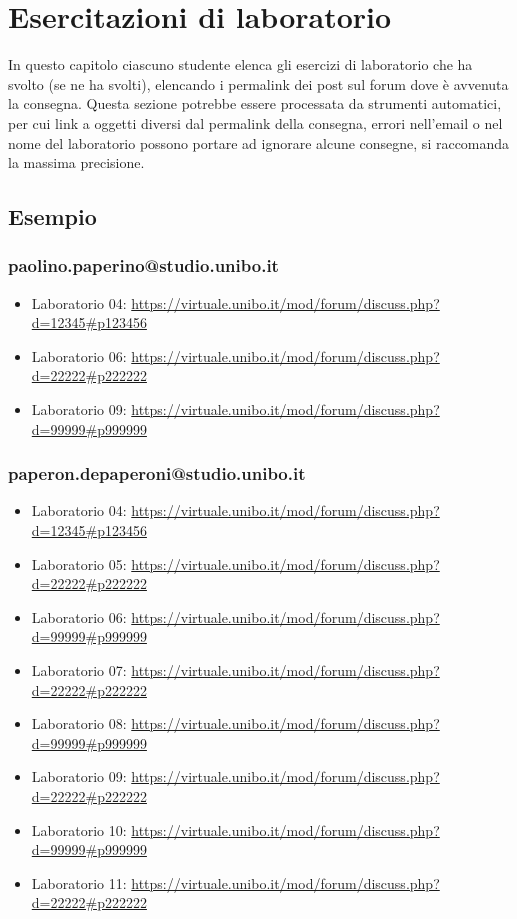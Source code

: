 \documentclass[a4paper,12pt]{report}
\begin{document}
\chapter{Esercitazioni di laboratorio}

In questo capitolo ciascuno studente elenca gli esercizi di laboratorio che ha svolto
(se ne ha svolti),
elencando i permalink dei post sul forum dove è avvenuta la consegna.
%
Questa sezione potrebbe essere processata da strumenti automatici,
per cui link a oggetti diversi dal permalink della consegna,
errori nell'email o nel nome del laboratorio possono portare ad ignorare alcune consegne,
si raccomanda la massima precisione.

\section*{Esempio}

\subsection{paolino.paperino@studio.unibo.it}

\begin{itemize}
 \item Laboratorio 04: \url{https://virtuale.unibo.it/mod/forum/discuss.php?d=12345#p123456}
 \item Laboratorio 06: \url{https://virtuale.unibo.it/mod/forum/discuss.php?d=22222#p222222}
 \item Laboratorio 09: \url{https://virtuale.unibo.it/mod/forum/discuss.php?d=99999#p999999}
\end{itemize}

\subsection{paperon.depaperoni@studio.unibo.it}

\begin{itemize}
 \item Laboratorio 04: \url{https://virtuale.unibo.it/mod/forum/discuss.php?d=12345#p123456}
 \item Laboratorio 05: \url{https://virtuale.unibo.it/mod/forum/discuss.php?d=22222#p222222}
 \item Laboratorio 06: \url{https://virtuale.unibo.it/mod/forum/discuss.php?d=99999#p999999}
 \item Laboratorio 07: \url{https://virtuale.unibo.it/mod/forum/discuss.php?d=22222#p222222}
 \item Laboratorio 08: \url{https://virtuale.unibo.it/mod/forum/discuss.php?d=99999#p999999}
 \item Laboratorio 09: \url{https://virtuale.unibo.it/mod/forum/discuss.php?d=22222#p222222}
 \item Laboratorio 10: \url{https://virtuale.unibo.it/mod/forum/discuss.php?d=99999#p999999}
 \item Laboratorio 11: \url{https://virtuale.unibo.it/mod/forum/discuss.php?d=22222#p222222}
\end{itemize}




\end{document}
